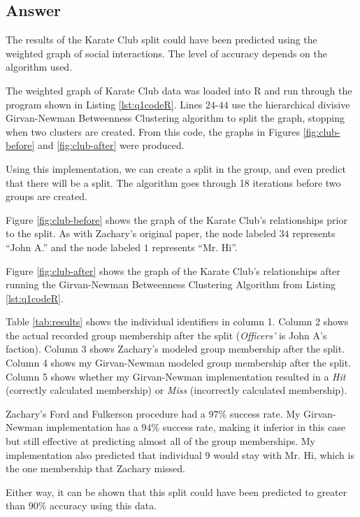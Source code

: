 \documentclass[letterpaper,11pt]{article}
\begin{document}
\newpage
\subsection*{Answer}

The results of the Karate Club split could have been predicted using the weighted graph of social interactions.  The level of accuracy depends on the algorithm used.

The weighted graph of Karate Club data was loaded into R and run through the program shown in Listing \ref{lst:q1codeR}.  Lines $24$-$44$ use the hierarchical divisive Girvan-Newman Betweenness Clustering algorithm to split the graph, stopping when two clusters are created.  From this code, the graphs in Figures \ref{fig:club-before} and \ref{fig:club-after} were produced.

Using this implementation, we can create a split in the group, and even predict that there will be a split.  The algorithm goes through 18 iterations before two groups are created.

Figure \ref{fig:club-before} shows the graph of the Karate Club's relationships prior to the split.  As with Zachary's original paper, the node labeled $34$ represents ``John A.'' and the node labeled $1$ represents ``Mr. Hi''.

Figure \ref{fig:club-after} shows the graph of the Karate Club's relationships after running the Girvan-Newman Betweenness Clustering Algorithm from Listing \ref{lst:q1codeR}.

Table \ref{tab:results} shows the individual identifiers in column 1.  Column 2 shows the actual recorded group membership after the split (\emph{Officers'} is John A's faction).  Column 3 shows Zachary's modeled group membership after the split.  Column 4 shows my Girvan-Newman modeled group membership after the split.  Column 5 shows whether my Girvan-Newman implementation resulted in a \emph{Hit} (correctly calculated membership) or \emph{Miss} (incorrectly calculated membership).

Zachary's Ford and Fulkerson procedure had a $97\%$ success rate.  My Girvan-Newman implementation has a $94\%$ success rate, making it inferior in this case but still effective at predicting almost all of the group memberships.  My implementation also predicted that individual $9$ would stay with Mr. Hi, which is the one membership that Zachary missed.

Either way, it can be shown that this split could have been predicted to greater than $90\%$ accuracy using this data.
\end{document}
